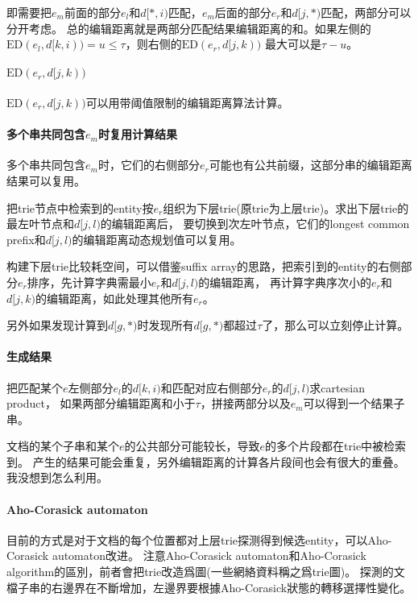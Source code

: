 即需要把$e_m$前面的部分$e_l$和$d[*,i)$匹配，$e_m$后面的部分$e_r$和$d[j,*)$匹配，两部分可以分开考虑。
总的编辑距离就是两部分匹配结果编辑距离的和。如果左侧的$\text{ED}(e_l,d[k,i))=u\leq \tau$，则右侧的$\text{ED}(e_r,d[j,k))$
最大可以是$\tau-u$。

\paragraph{$\text{ED}(e_r,d[j,k))$}

$\text{ED}(e_r,d[j,k))$可以用带阈值限制的编辑距离算法计算。

\paragraph{多个串共同包含$e_m$时复用计算结果}

多个串共同包含$e_m$时，它们的右侧部分$e_r$可能也有公共前缀，这部分串的编辑距离结果可以复用。

把trie节点中检索到的entity按$e_r$组织为下层trie(原trie为上层trie)。求出下层trie的最左叶节点和$d[j,l)$的编辑距离后，
要切换到次左叶节点，它们的longest common prefix和$d[j,l)$的编辑距离动态规划值可以复用。

构建下层trie比较耗空间，可以借鉴suffix array的思路，把索引到的entity的右侧部分$e_r$排序，先计算字典需最小$e_r$和$d[j,l)$的编辑距离，
再计算字典序次小的$e_r$和$d[j,k)$的编辑距离，如此处理其他所有$e_r$。

另外如果发现计算到$d[g,*)$时发现所有$d[g,*)$都超过$\tau$了，那么可以立刻停止计算。

\paragraph{生成结果}

把匹配某个$e$左侧部分$e_l$的$d[k,i)$和匹配对应右侧部分$e_r$的$d[j,l)$求cartesian product，
如果两部分编辑距离和小于$\tau$，拼接两部分以及$e_m$可以得到一个结果子串。

文档的某个子串和某个$e$的公共部分可能较长，导致$e$的多个片段都在trie中被检索到。
产生的结果可能会重复，另外编辑距离的计算各片段间也会有很大的重叠。我没想到怎么利用。

\paragraph{Aho-Corasick automaton}

目前的方式是对于文档的每个位置都对上层trie探测得到候选entity，可以Aho-Corasick automaton改进。
注意Aho-Corasick automaton和Aho-Corasick algorithm的區別，前者會把trie改造爲圖(一些網絡資料稱之爲trie圖)。
探測的文檔子串的右邊界在不斷增加，左邊界要根據Aho-Corasick狀態的轉移選擇性變化。

